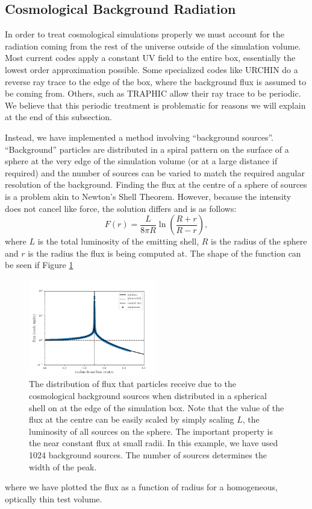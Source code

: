 \documentclass[fleqn,usenatbib]{mnras}
\begin{document}
\subsection{Cosmological Background Radiation}
In order to treat cosmological simulations properly we must account for the 
radiation coming from the rest of the universe outside of the simulation 
volume. Most current codes apply a constant UV field to the entire box, 
essentially the lowest order approximation possible. Some specialized codes 
like URCHIN \citep{altayTheuns13} do a reverse ray trace to the edge of the 
box, where the background flux is assumed to be coming from. Others, such as 
TRAPHIC \citep{pawlikSchaye08} allow their ray trace to be periodic. We believe
 that this periodic treatment is problematic for reasons we will explain at the
 end of this subsection. 

Instead, we have implemented a method involving ``background sources''. 
``Background'' particles are distributed in a spiral pattern on the surface of 
a sphere at the very edge of the simulation volume (or at a large distance if 
required) and the number of sources can be varied to match the required angular
 resolution  of the background. Finding the flux at the centre of a sphere of 
sources is a problem akin to Newton's Shell Theorem. However, because the 
intensity does not cancel like force, the solution differs and is as follows:
\begin{equation}\label{eq:cosmofield}
F(r) = \frac{L}{8\pi R} \ln \left(\frac{R+r}{R-r}\right),
\end{equation}
where $L$ is the total luminosity of the emitting shell, $R$ is the radius of 
the sphere and $r$ is the radius the flux is being computed at. The shape of 
the function can be seen if Figure \ref{fig:cosmofield}
\begin{figure}
\label{fig:cosmofield}
\includegraphics[width=0.5\textwidth]{Figures/cosmofield.png}
\caption{The distribution of flux that particles receive due to the 
cosmological background sources when distributed in a spherical shell on at the
 edge of the simulation box. Note that the value of the flux at the centre can
 be easily scaled by simply scaling $L$, the luminosity of all sources on the 
sphere. The important property is the near constant flux at small radii. In
 this example, we have used 1024 background sources. The number of sources 
determines the width of the peak.}
\end{figure}
where we have plotted the flux as a function of radius for a homogeneous,
optically thin test volume.
\end{document}
